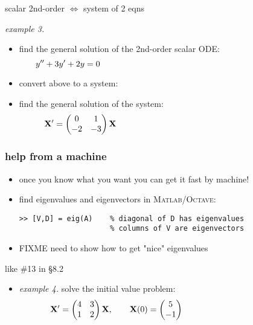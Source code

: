 \documentclass[urlcolor=blue,dvipsnames]{beamer}
\newcommand{\bX}{\mathbf{X}}
\newcommand{\Matlab}{\textsc{Matlab}\xspace}
\newcommand{\Octave}{\textsc{Octave}\xspace}
\begin{document}
\begin{frame}{scalar 2nd-order $\iff$ system of 2 eqns}

\noindent \emph{example 3.}
\begin{itemize}
\item find the general solution of the 2nd-order scalar ODE:
$$y''+3y'+2y=0 \hspace{80mm}$$

\vspace{7mm}
\item convert above to a system:

\vspace{10mm}
\item find the general solution of the system:
$$\bX' = \begin{pmatrix} 0 & 1 \\ -2 & -3 \end{pmatrix} \bX \hspace{70mm}$$

\vspace{12mm}
\end{itemize}
\end{frame}


\begin{frame}[fragile]
\frametitle{help from a machine}

\begin{itemize}
\item \alert{once you know what you want you can get it fast by machine!}
\item find eigenvalues and eigenvectors in \Matlab/\Octave:
\begin{Verbatim}[fontsize=\small]
>> [V,D] = eig(A)    % diagonal of D has eigenvalues
                     % columns of V are eigenvectors
\end{Verbatim}
\item FIXME  need to show how to get "nice" eigenvalues
\end{itemize}
\end{frame}


\begin{frame}{like \#13 in \S8.2}

\begin{itemize}
\item \emph{example 4.}  solve the initial value problem:
$$\bX' = \begin{pmatrix} 4 & 3 \\ 1 & 2 \end{pmatrix} \bX, \qquad \bX(0) = \begin{pmatrix} 5 \\ -1 \end{pmatrix} \hspace{40mm}$$
\end{itemize}

\vspace{70mm}
\end{frame}
\end{document}
